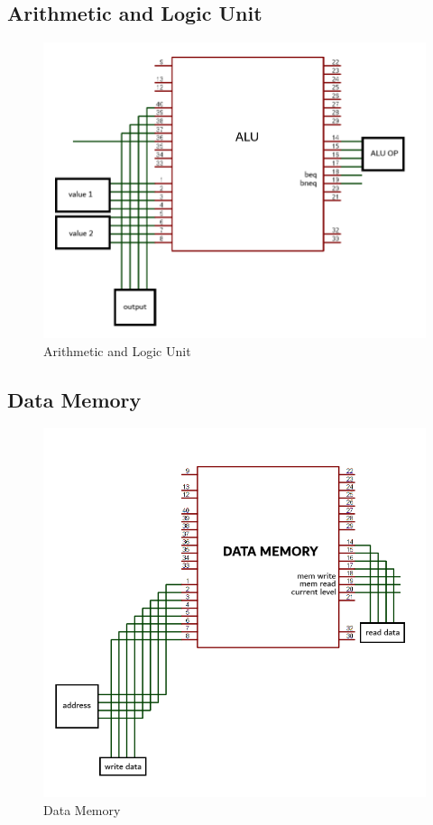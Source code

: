 \documentclass{article}
\begin{document}
		\newpage
		
		\subsection{Arithmetic and Logic Unit}
		
		\begin{figure}[h]
			\centering
			\includegraphics[scale=0.9]{images/alu.png}
			\caption{Arithmetic and Logic Unit}
			\label{fig:enter-label}
		\end{figure}
		
		\newpage
		
		\subsection{Data Memory}
		
		\begin{figure}[h]
			\centering
			\includegraphics[scale=0.9]{images/dm.png}
			\caption{Data Memory}
			\label{fig:enter-label}
		\end{figure}
		
\end{document}

